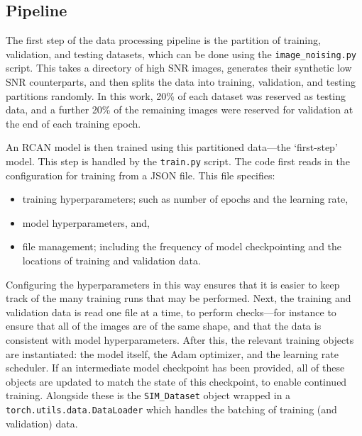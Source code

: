 \documentclass[12pt]{article}
\begin{document}
\subsection{Pipeline}

The first step of the data processing pipeline is the partition of training, validation, and testing datasets,
which can be done using the \texttt{image\_noising.py} script.
This takes a directory of high SNR images, generates their synthetic low SNR counterparts,
and then splits the data into training, validation, and testing partitions randomly.
In this work, 20\% of each dataset was reserved as testing data,
and a further 20\% of the remaining images were reserved for validation at the end of each training epoch.

An RCAN model is then trained using this partitioned data---the `first-step' model.
This step is handled by the \texttt{train.py} script.
The code first reads in the configuration for training from a JSON file.
This file specifies:
\begin{itemize}
    \item training hyperparameters; such as number of epochs and the learning rate,
    \item model hyperparameters, and,
    \item file management; including the frequency of model checkpointing and the locations of training and validation data.
\end{itemize}
Configuring the hyperparameters in this way ensures that it is easier to keep track of the many training runs that may be performed.
Next, the training and validation data is read one file at a time, to perform checks---for instance to ensure that all of the images are of the same shape,
and that the data is consistent with model hyperparameters.
After this, the relevant training objects are instantiated: the model itself, the Adam optimizer, and the learning rate scheduler.
If an intermediate model checkpoint has been provided, all of these objects are updated to match the state of this checkpoint,
to enable continued training.
Alongside these is the \texttt{SIM\_Dataset} object wrapped in a \texttt{torch.utils.data.DataLoader} which handles the batching of training (and validation) data.
\end{document}
